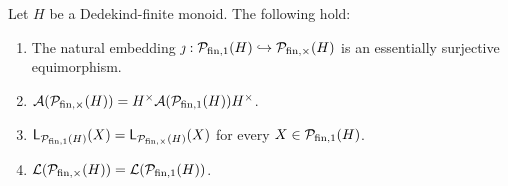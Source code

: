 \begin{prop}\label{prop:funt&fun-have-the-same-system-of-lengths}
	Let $H$ be a Dedekind-finite monoid. The following hold:
	\begin{enumerate}[label={\rm (\roman{*})}]
	\item\label{it:prop:funt&fun-have-the-same-system-of-lengths(i)} The natural embedding $\jmath: \mathcal{P}_{\textrm{fin}, 1}(H)\hookrightarrow \mathcal{P}_{\textrm{fin}, \times}(H)$ is an essentially surjective equimorphism.
	\item\label{it:prop:funt&fun-have-the-same-system-of-lengths(ii)} $\mathcal{A}(\mathcal P_{{\textrm{fin}, \times}}(H)) = H^\times \mathcal{A}(\mathcal P_{{\textrm{fin}, 1}}(H)) H^\times$.
	\item\label{it:prop:funt&fun-have-the-same-system-of-lengths(iii)} $\mathsf{L}_{\mathcal P_{{\textrm{fin}, 1}}(H)}(X) = \mathsf{L}_{\mathcal P_{{\textrm{fin}, \times}}(H)}(X)$ for every $X \in \mathcal P_{{\textrm{fin}, 1}}(H)$.
	\item\label{it:prop:funt&fun-have-the-same-system-of-lengths(iv)} $\mathcal{L}(\mathcal P_{{\textrm{fin}, \times}}(H)) = \mathcal{L}(\mathcal P_{{\textrm{fin}, 1}}(H))$.
	\end{enumerate}
\end{prop}
%
